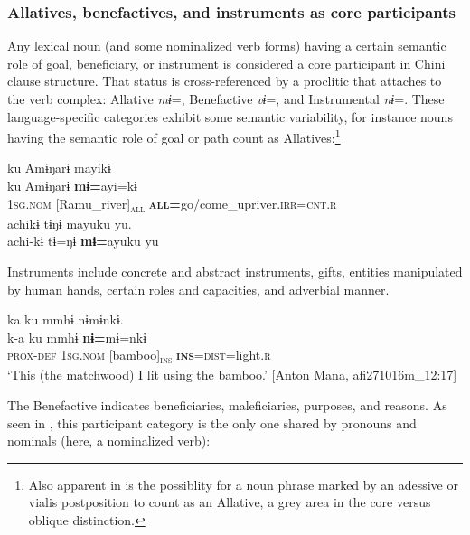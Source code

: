 \documentclass[output=paper]{langscibook}
\begin{document}
\subsubsection{{Allatives,} {benefactives,} {and} {instruments} {as} {core} {participants}}\label{sec:brooks:2.2.2}

Any lexical noun (and some nominalized verb forms) having a certain semantic role of goal, beneficiary, or instrument is considered a core participant in Chini clause structure. That status is cross-referenced by a proclitic that attaches to the verb complex: Allative \textit{mɨ}=, Benefactive \textit{vɨ}=, and Instrumental \textit{nɨ}=. These language-specific categories exhibit some semantic variability, for instance nouns having the semantic role of goal or path count as Allatives:\footnote{Also apparent in  is the possiblity for a noun phrase marked by an adessive or vialis postposition to count as an Allative, a grey area in the core versus oblique distinction.}

\ea\label{ex:brooks:3}
\glll ku  Amɨŋarɨ  mayikɨ\\
ku  Amɨŋarɨ  \textbf{mɨ=}ayi=kɨ\\
\textsc{1sg.nom}  [Ramu\_river]\textsc{\textsubscript{all} } \textbf{\textsc{all}}\textbf{=}go/come\_upriver.\textsc{irr=cnt.r} \\

\glll achikɨ   tɨŋɨ    mayuku  yu.\\
 achi-kɨ  tɨ=ŋɨ    \textbf{mɨ=}ayuku  yu\\
 [upriver\textsc{-prox}  path=\textsc{adess]}\textsc{\textsubscript{all}} \textbf{\textsc{all}}\textbf{=}quickly go/come.\textsc{irr}\\
 \glt `I'll go upriver on the Ramu (River), going quickly on the upriver route.'
 [Dorothy Paul, afi260814m\_29:03]
\z


Instruments include concrete and abstract instruments, gifts, entities manipulated by human hands, certain roles and capacities, and adverbial manner.

\ea\label{ex:brooks:4}
\glll ka  ku  mmhɨ  nɨmɨnkɨ.\\
k-a  ku  mmhɨ  \textbf{nɨ=}mɨ=nkɨ\\
\textsc{prox-def}  \textsc{1sg.nom}  [bamboo]\textsc{\textsubscript{ins} } \textbf{\textsc{ins}}\textsc{=dist}=light.\textsc{r}\\
 \glt `This (the matchwood) I lit using the bamboo.' [Anton Mana, afi271016m\_12:17]
\z


The Benefactive indicates beneficiaries, maleficiaries, purposes, and reasons. As seen in , this participant category is the only one shared by pronouns and nominals (here, a nominalized verb):%
\end{document}
